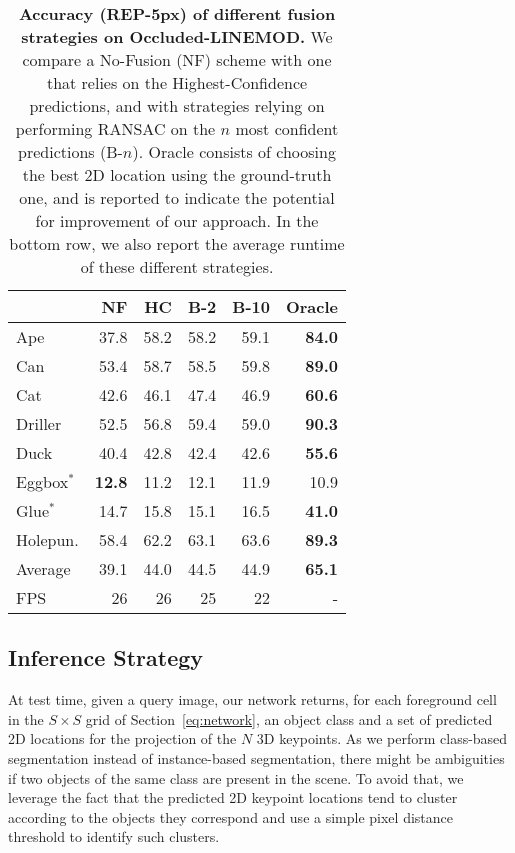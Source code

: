 \documentclass[10pt,twocolumn,letterpaper]{article}
\begin{document}
\begin{table}
	\centering
	\begin{tabular}{lrrrrr}
	\toprule
	&	NF & HC	& B-2 & B-10	&	Oracle	\\
	\midrule
	Ape			&37.8&58.2&58.2&59.1&{\bf 84.0} \\
	Can			&53.4&58.7&58.5&59.8&{\bf 89.0} \\
	Cat 		&42.6&46.1&47.4&46.9&{\bf 60.6} \\
	Driller		&52.5&56.8&59.4&59.0&{\bf 90.3} \\
	Duck		&40.4&42.8&42.4&42.6&{\bf 55.6} \\
	Eggbox$^*$	&{\bf 12.8}&11.2&12.1&11.9& 10.9 \\
	Glue$^*$	&14.7&15.8&15.1&16.5&{\bf 41.0} \\
	Holepun.	&58.4&62.2&63.1&63.6&{\bf 89.3} \\
	\midrule
	Average		&39.1&44.0&44.5&44.9&{\bf 65.1} \\
	\bottomrule
	FPS	& 26	& 26	&	25 & 22	& - \\
	\end{tabular}
	\vspace{-3mm}
	\caption{{\bf Accuracy (REP-5px) of different fusion strategies on Occluded-LINEMOD.} We compare a No-Fusion (NF) scheme with one that relies on the Highest-Confidence predictions, and with strategies relying on performing RANSAC on the $n$ most confident predictions (B-$n$). Oracle consists of choosing the best 2D location using the ground-truth one, and is reported to indicate the potential for improvement of our approach. In the bottom row, we also report the average runtime of these different strategies.}
\label{tab:different_inference}
\end{table} 
 
\subsection{Inference Strategy}
\label{sec:inference}

At test time, given a query image, our network returns, for each foreground cell in the $S \times S$ grid of Section~\ref{eq:network}, an object class and a set of predicted 2D locations for the projection of the $N$ 3D keypoints. As we perform class-based segmentation instead of instance-based segmentation, there might  be ambiguities if two objects of the same class are present in the scene. To avoid that,  we leverage the fact that the predicted 2D keypoint locations tend to cluster according to the objects they correspond and use a simple pixel distance threshold to identify such clusters.
\end{document}
